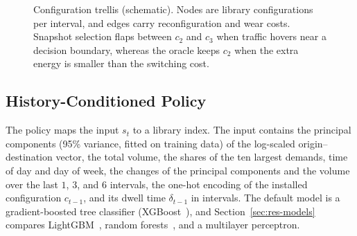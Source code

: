 \documentclass[journal]{IEEEtran}
\begin{document}
\begin{figure}[t]
\centering
{}
\caption{Configuration trellis (schematic). Nodes are library configurations per interval, and edges carry reconfiguration and wear costs. Snapshot selection flaps between $c_2$ and $c_3$ when traffic hovers near a decision boundary, whereas the oracle keeps $c_2$ when the extra energy is smaller than the switching cost.}
\label{fig:trellis}
\end{figure}

\subsection{History-Conditioned Policy}

The policy maps the input $s_t$ to a library index. The input contains the principal components (95\% variance, fitted on training data) of the log-scaled origin--destination vector, the total volume, the shares of the ten largest demands, time of day and day of week, the changes of the principal components and the volume over the last $1$, $3$, and $6$ intervals, the one-hot encoding of the installed configuration $c_{t-1}$, and its dwell time $\delta_{t-1}$ in intervals. The default model is a gradient-boosted tree classifier (XGBoost~\cite{chen2016xgboost}), and Section~\ref{sec:res-models} compares LightGBM~\cite{ke2017lightgbm}, random forests~\cite{breiman2001rf}, and a multilayer perceptron.
\end{document}
